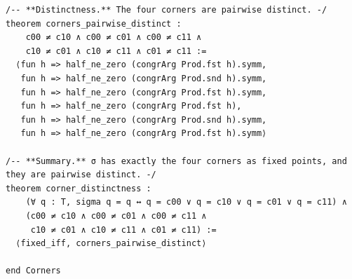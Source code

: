 \documentclass[11pt,a4paper]{article}
\theoremstyle{plain}
\theoremstyle{definition}
\theoremstyle{remark}
\begin{document}
\begin{Verbatim}[fontsize=\footnotesize,breaklines=true,breakanywhere=true,formatcom=\leanmono]
/-- **Distinctness.** The four corners are pairwise distinct. -/
theorem corners_pairwise_distinct :
    c00 ≠ c10 ∧ c00 ≠ c01 ∧ c00 ≠ c11 ∧
    c10 ≠ c01 ∧ c10 ≠ c11 ∧ c01 ≠ c11 :=
  ⟨fun h => half_ne_zero (congrArg Prod.fst h).symm,
   fun h => half_ne_zero (congrArg Prod.snd h).symm,
   fun h => half_ne_zero (congrArg Prod.fst h).symm,
   fun h => half_ne_zero (congrArg Prod.fst h),
   fun h => half_ne_zero (congrArg Prod.snd h).symm,
   fun h => half_ne_zero (congrArg Prod.fst h).symm⟩

/-- **Summary.** σ has exactly the four corners as fixed points, and
they are pairwise distinct. -/
theorem corner_distinctness :
    (∀ q : T, sigma q = q ↔ q = c00 ∨ q = c10 ∨ q = c01 ∨ q = c11) ∧
    (c00 ≠ c10 ∧ c00 ≠ c01 ∧ c00 ≠ c11 ∧
     c10 ≠ c01 ∧ c10 ≠ c11 ∧ c01 ≠ c11) :=
  ⟨fixed_iff, corners_pairwise_distinct⟩

end Corners
\end{Verbatim}
\end{document}
